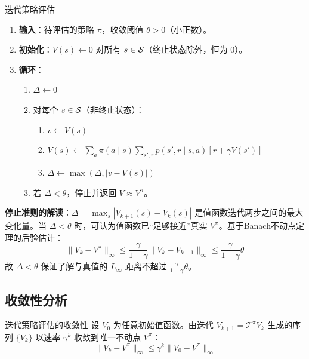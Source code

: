 \begin{myalgorithm}{迭代策略评估}
\begin{enumerate}
    \item \textbf{输入}：待评估的策略 $\pi$，收敛阈值 $\theta > 0$（小正数）。
    \item \textbf{初始化}：$V(s) \leftarrow 0$ 对所有 $s \in \mathcal{S}$（终止状态除外，恒为 $0$）。
    \item \textbf{循环}：
    \begin{enumerate}
        \item $\Delta \leftarrow 0$
        \item 对每个 $s \in \mathcal{S}$（非终止状态）：
        \begin{enumerate}
            \item $v \leftarrow V(s)$
            \item $V(s) \leftarrow \sum_{a} \pi(a \mid s) \sum_{s', r} p(s', r \mid s, a) \left[ r + \gamma V(s') \right]$
            \item $\Delta \leftarrow \max(\Delta, |v - V(s)|)$
        \end{enumerate}
        \item 若 $\Delta < \theta$，停止并返回 $V \approx V^{\pi}$。
    \end{enumerate}
\end{enumerate}
\end{myalgorithm}

\textbf{停止准则的解读}：$\Delta = \max_s |V_{k+1}(s) - V_k(s)|$ 是值函数迭代两步之间的最大变化量。当 $\Delta < \theta$ 时，可认为值函数已``足够接近''真实 $V^{\pi}$。基于Banach不动点定理的后验估计：
\[
\|V_k - V^{\pi}\|_\infty \le \frac{\gamma}{1 - \gamma} \|V_k - V_{k-1}\|_\infty \le \frac{\gamma}{1 - \gamma} \theta
\]
故 $\Delta < \theta$ 保证了解与真值的 $L_\infty$ 距离不超过 $\frac{\gamma}{1-\gamma} \theta$。

\subsection{收敛性分析}

\begin{myTheorem}{迭代策略评估的收敛性}
设 $V_0$ 为任意初始值函数。由迭代 $V_{k+1} = \mathcal{T}^{\pi} V_k$ 生成的序列 $\{V_k\}$ 以速率 $\gamma^k$ 收敛到唯一不动点 $V^{\pi}$：
\[
\|V_k - V^{\pi}\|_\infty \le \gamma^k \|V_0 - V^{\pi}\|_\infty
\]
\end{myTheorem}

